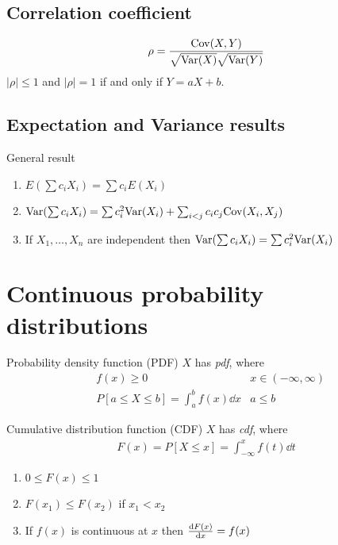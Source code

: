 \documentclass[16pt,a4paper]{article}
\begin{document}
\subsection{Correlation coefficient}
\begin{defn}{}
    \begin{align*}
        \rho = \frac{\mathrm{Cov}(X,Y)}{\sqrt{\mathrm{Var}(X)}\sqrt{\mathrm{Var}(Y)}}
    \end{align*}
    $|\rho| \leq 1$ and $|\rho| = 1$ if and only if $Y = aX+b$. 
\end{defn}
\newpage
\subsection{Expectation and Variance results}
\begin{thm}{General result}
    \begin{enumerate}[(1)]
        \item $E(\sum c_iX_i) = \sum c_iE(X_i)$
        \item $\mathrm{Var}(\sum c_iX_i) = \sum c_i^2\mathrm{Var}(X_i) + \sum_{i<j}c_ic_j\mathrm{Cov}(X_i,X_j)$
        \item If $X_1, \ldots,X_n$ are independent then   $\mathrm{Var}(\sum c_iX_i) = \sum c_i^2\mathrm{Var}(X_i)$
    \end{enumerate}
\end{thm}



\newpage
\section{Continuous probability distributions}
\begin{defn}{Probability density function (PDF)}
    $X$ has \textit{pdf}, where 
    \begin{align*}
        & f(x) \geq 0 & x\in (-\infty, \infty)\\
        & P[a\leq X \leq b] = \int_a^b f(x) \dd x & a\leq b
    \end{align*}
\end{defn}

\begin{defn}{Cumulative distribution function (CDF)}
    $X$ has \textit{cdf}, where 
    \begin{align*}
        F(x) = P[X\leq x] = \int_{-\infty}^x f(t) \dd t
    \end{align*}
    \begin{enumerate}[(1)]
        \item $0\leq F(x) \leq 1$
        \item $F(x_1) \leq F(x_2)$ if $x_1 < x_2$
        \item If $f(x)$ is continuous at $x$ then $\dv{F(x)}{x} = f(x)$
    \end{enumerate}
\end{defn}
\end{document}
